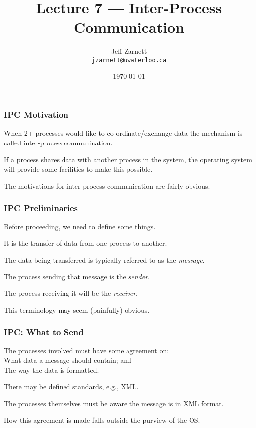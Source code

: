

\title{Lecture 7 --- Inter-Process Communication}

\author{Jeff Zarnett \\ \small \texttt{jzarnett@uwaterloo.ca}}
\date{\today}




\begin{frame}
  \titlepage

 \end{frame}

\begin{frame}
\frametitle{IPC Motivation}

When 2+ processes would like to co-ordinate/exchange data the mechanism is called \alert{inter-process communication}.

If a process shares data with another process in the system, the operating system will provide some facilities to make this possible. 

The motivations for inter-process communication are fairly obvious.

\end{frame}


\begin{frame}
\frametitle{IPC Preliminaries}

Before proceeding, we need to define some things. 

It is the transfer of data from one process to another. 

The data being transferred is typically referred to as the \textit{message}. 

The process sending that message is the \textit{sender}.

The process receiving it will be the \textit{receiver}.

 This terminology may seem (painfully) obvious. 

\end{frame}


\begin{frame}
\frametitle{IPC: What to Send}

The processes involved must have some agreement on:\\
\quad What data a message should contain; and\\
\quad The way the data is formatted. 

There may be defined standards, e.g., XML.

The processes themselves must be aware the message is in XML format. 

How this agreement is made falls outside the purview of the OS.

\end{frame}


